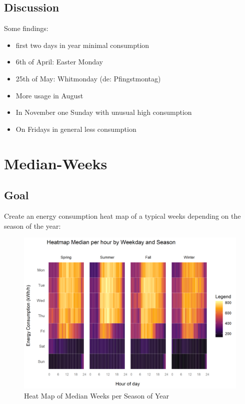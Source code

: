 \documentclass[
  a4paperpaper,
]{book}
\begin{document}
\hypertarget{discussion-5}{%
\subsection{Discussion}\label{discussion-5}}

Some findings:

\begin{itemize}
\item
  first two days in year minimal consumption
\item
  6th of April: Easter Monday
\item
  25th of May: Whitmonday (de: Pfingstmontag)
\item
  More usage in August
\item
  In November one Sunday with unusual high consumption
\item
  On Fridays in general less consumption
\end{itemize}

\newpage

\hypertarget{median-weeks}{%
\section{Median-Weeks}\label{median-weeks}}

\hypertarget{goal-7}{%
\subsection{Goal}\label{goal-7}}

Create an energy consumption heat map of a typical weeks depending on the season of the year:

\begin{figure}
\includegraphics[width=0.7\linewidth]{images/plotHeatMapMedianWeeks} \caption{Heat Map of Median Weeks per Season of Year}\label{fig:unnamed-chunk-16}
\end{figure}
\end{document}

